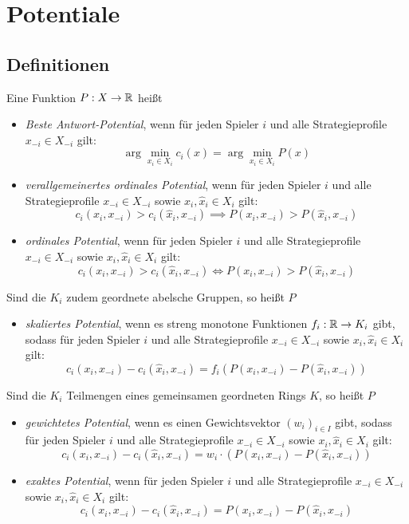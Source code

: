 \section{Potentiale}\label{sec:Potentiale}

\subsection{Definitionen}

\begin{defn}
	Eine Funktion $P: X \to \mathbb{R}$ heißt
	\begin{itemize}
		\item \emph{Beste Antwort-Potential}, wenn für jeden Spieler $i$ und alle Strategieprofile $x_{-i} \in X_{-i}$ gilt:
			\[\arg \min_{x_i \in X_i}c_i(x) = \arg \min_{x_i \in X_i} P(x)\]
		\item \emph{verallgemeinertes ordinales Potential}, wenn für jeden Spieler $i$ und alle Strategieprofile $x_{-i} \in X_{-i}$ sowie $x_i, \hat{x}_i \in X_i$ gilt:
			\[c_i(x_i,x_{-i}) > c_i(\hat{x}_i, x_{-i}) \implies P(x_i,x_{-i}) > P(\hat{x}_i, x_{-i})\]
		\item \emph{ordinales Potential}, wenn für jeden Spieler $i$ und alle Strategieprofile $x_{-i} \in X_{-i}$ sowie $x_i, \hat{x}_i \in X_i$ gilt:
			\[c_i(x_i,x_{-i}) > c_i(\hat{x}_i, x_{-i}) \iff P(x_i,x_{-i}) > P(\hat{x}_i, x_{-i})\]
	\end{itemize}
	Sind die $K_i$ zudem geordnete abelsche Gruppen, so heißt $P$
	\begin{itemize}
		\item \emph{skaliertes Potential}, wenn es streng monotone Funktionen $f_i: \mathbb{R} \to K_i$ gibt, sodass für jeden Spieler $i$ und alle Strategieprofile $x_{-i} \in X_{-i}$ sowie $x_i, \hat{x}_i \in X_i$ gilt:
			\[c_i(x_i,x_{-i}) - c_i(\hat{x}_i, x_{-i}) = f_i(P(x_i,x_{-i}) - P(\hat{x}_i, x_{-i}))\]
	\end{itemize}
	Sind die $K_i$ Teilmengen eines gemeinsamen geordneten Rings $K$, so heißt $P$
	\begin{itemize}	
		\item \emph{gewichtetes Potential}, wenn es einen Gewichtsvektor $(w_i)_{i\in I}$ gibt, sodass für jeden Spieler $i$ und alle Strategieprofile $x_{-i} \in X_{-i}$ sowie $x_i, \hat{x}_i \in X_i$ gilt:
			\[c_i(x_i,x_{-i}) - c_i(\hat{x}_i, x_{-i}) = w_i\cdot(P(x_i,x_{-i}) - P(\hat{x}_i, x_{-i}))\]
		\item \emph{exaktes Potential}, wenn für jeden Spieler $i$ und alle Strategieprofile $x_{-i} \in X_{-i}$ sowie $x_i, \hat{x}_i \in X_i$ gilt:
			\[c_i(x_i,x_{-i}) - c_i(\hat{x}_i, x_{-i}) = P(x_i,x_{-i}) - P(\hat{x}_i, x_{-i})\]
	\end{itemize}
\end{defn}

